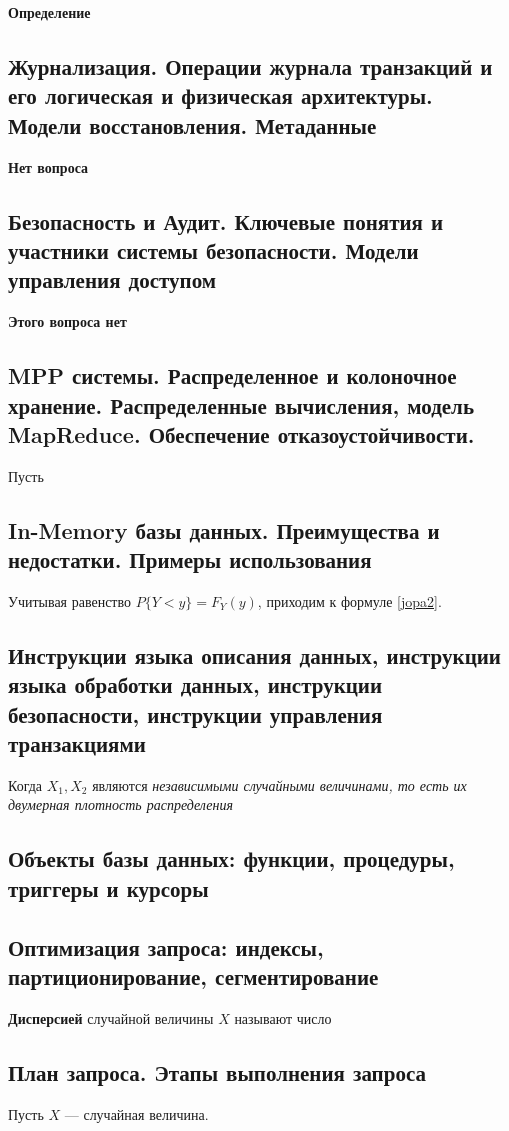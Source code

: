 \textbf{Определение}


\subsection{Журнализация. Операции журнала транзакций и его логическая и физическая архитектуры. Модели восстановления. Метаданные}

\textbf{Нет вопроса}

\subsection{Безопасность и Аудит. Ключевые понятия и участники системы безопасности. Модели управления доступом}

\textbf{Этого вопроса нет}


\subsection{MPP системы. Распределенное и колоночное хранение. Распределенные вычисления, модель MapReduce. Обеспечение отказоустойчивости.}

Пусть

\subsection{In-Memory базы данных. Преимущества и недостатки. Примеры использования}

Учитывая равенство $P\{Y < y\} = 	F_Y(y)$, приходим к формуле \ref{jopa2}.

\subsection{Инструкции языка описания данных, инструкции языка обработки данных, инструкции безопасности, инструкции управления транзакциями}

Когда $X_1, X_2$ являются \textit{независимыми случайными величинами, то есть их двумерная плотность распределения}



\subsection{Объекты базы данных: функции, процедуры, триггеры и курсоры}


\subsection{Оптимизация запроса: индексы, партиционирование, сегментирование}

\textbf{Дисперсией} случайной величины $X$ называют число



\subsection{План запроса. Этапы выполнения запроса}

Пусть $X$ --- случайная величина.
